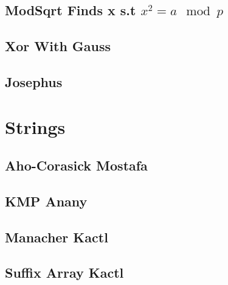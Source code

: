\subsection{ModSqrt Finds x s.t ${x^2 = a \mod p}$}
\vspace{-2ex}
\raggedbottom
\vspace{-3.2ex}
\hrulefill
\subsection{Xor With Gauss}
\vspace{-2ex}
\raggedbottom
\vspace{-3.2ex}
\hrulefill
\subsection{Josephus}
\vspace{-2ex}
\raggedbottom
\vspace{-3.2ex}
\hrulefill

\section{Strings}
\subsection{Aho-Corasick Mostafa}
\vspace{-2ex}
\raggedbottom
\vspace{-3.2ex}
\hrulefill
\subsection{KMP Anany}
\vspace{-2ex}
\raggedbottom
\vspace{-3.2ex}
\hrulefill
\subsection{Manacher Kactl}
\vspace{-2ex}
\raggedbottom
\vspace{-3.2ex}
\hrulefill
\subsection{Suffix Array Kactl}
\vspace{-2ex}
\raggedbottom
\vspace{-3.2ex}
\hrulefill
